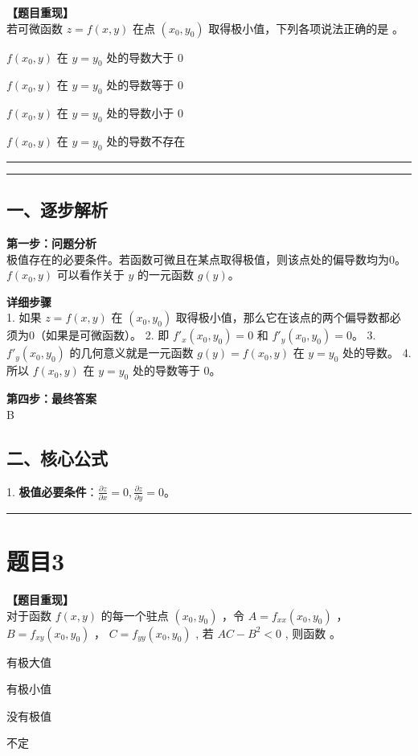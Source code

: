\documentclass[12pt, a4paper]{ctexart}
\newcommand{\TopSeparator}{
    \par\noindent\rule{\textwidth}{1.5pt}\vspace{0.5em} %
}
\newcommand{\AnalysisSeparator}{
    \par\noindent\rule{\textwidth}{0.5pt}\vspace{0.2em}\hrule\vspace{0.5em} %
}
\newenvironment{RedAnalysis}{
    \par
    \color{red} %
}{
    \par
    \color{black} %
}
\newcommand{\choicesFour}[4]{
    \begin{enumerate}[label=\Alph*., itemsep=0pt, parsep=0pt, topsep=5pt, labelsep=0.5em]
        \begin{minipage}{0.22\linewidth} \item #1 \end{minipage}
        \begin{minipage}{0.22\linewidth} \item #2 \end{minipage}
        \begin{minipage}{0.22\linewidth} \item #3 \end{minipage}
        \begin{minipage}{0.22\linewidth} \item #4 \end{minipage}
    \end{enumerate}
}
\newcommand{\choicesTwo}[4]{
    \begin{enumerate}[label=\Alph*., itemsep=0pt, parsep=0pt, topsep=5pt, labelsep=0.5em]
        \begin{minipage}{0.45\linewidth} \item #1 \end{minipage}
        \begin{minipage}{0.45\linewidth} \item #2 \end{minipage}
        \begin{minipage}{0.45\linewidth} \item #3 \end{minipage}
        \begin{minipage}{0.45\linewidth} \item #4 \end{minipage}
    \end{enumerate}
}
\begin{document}
\textbf{【题目重现】} \\
若可微函数 $ z = f(x, y) $ 在点 $ (x_{0}, y_{0}) $ 取得极小值，下列各项说法正确的是 \underline{\hspace{1cm}}。
\choicesTwo
{$ f(x_0,y) $ 在 $ y=y_{0} $ 处的导数大于 0}
{$ f(x_0,y) $ 在 $ y=y_{0} $ 处的导数等于 0}
{$ f(x_0,y) $ 在 $ y=y_{0} $ 处的导数小于 0}
{$ f(x_0,y) $ 在 $ y=y_{0} $ 处的导数不存在}

\AnalysisSeparator

\begin{RedAnalysis}

\subsection*{一、逐步解析}

\textbf{第一步：问题分析} \\
极值存在的必要条件。若函数可微且在某点取得极值，则该点处的偏导数均为0。
$f(x_0, y)$ 可以看作关于 $y$ 的一元函数 $g(y)$。

\textbf{详细步骤} \\
1. 如果 $z=f(x,y)$ 在 $(x_0, y_0)$ 取得极小值，那么它在该点的两个偏导数都必须为0（如果是可微函数）。
2. 即 $f'_x(x_0, y_0) = 0$ 和 $f'_y(x_0, y_0) = 0$。
3. $f'_y(x_0, y_0)$ 的几何意义就是一元函数 $g(y) = f(x_0, y)$ 在 $y=y_0$ 处的导数。
4. 所以 $f(x_0, y)$ 在 $y=y_0$ 处的导数等于 0。

\textbf{第四步：最终答案} \\
B

\subsection*{二、核心公式}
1. \textbf{极值必要条件}：$\frac{\partial z}{\partial x} = 0, \frac{\partial z}{\partial y} = 0$。

\end{RedAnalysis}

\vspace{2em}

\TopSeparator
\section*{题目3}

\textbf{【题目重现】} \\
对于函数 $ f(x,y) $ 的每一个驻点 $ (x_{0},y_{0}) $ ，令 $ A=f_{xx}(x_{0},y_{0}) $ ， $ B=f_{xy}(x_{0},y_{0}) $ ， $ C = f_{yy}(x_{0}, y_{0}) $ , 若 $ AC - B^{2} < 0 $ , 则函数 \underline{\hspace{1cm}}。
\choicesFour{有极大值}{有极小值}{没有极值}{不定}
\end{document}
